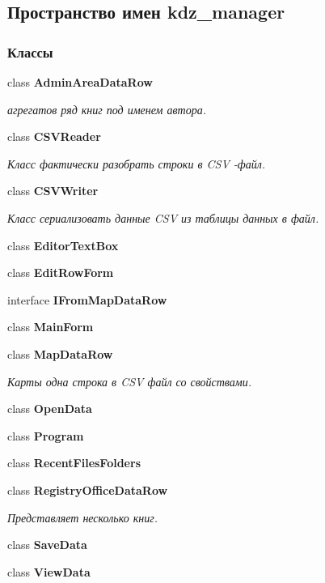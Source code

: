 \subsection{Пространство имен kdz\+\_\+manager}
\label{namespacekdz__manager}
\subsubsection*{Классы}
\begin{DoxyCompactItemize}
\item 
class {\bf Admin\+Area\+Data\+Row}
\begin{DoxyCompactList}\small\item\em агрегатов ряд книг под именем автора. \end{DoxyCompactList}\item 
class {\bf C\+S\+V\+Reader}
\begin{DoxyCompactList}\small\item\em Класс фактически разобрать строки в C\+S\+V -\/файл. \end{DoxyCompactList}\item 
class {\bf C\+S\+V\+Writer}
\begin{DoxyCompactList}\small\item\em Класс сериализовать данные C\+S\+V из таблицы данных в файл. \end{DoxyCompactList}\item 
class {\bf Editor\+Text\+Box}
\item 
class {\bf Edit\+Row\+Form}
\item 
interface {\bf I\+From\+Map\+Data\+Row}
\item 
class {\bf Main\+Form}
\item 
class {\bf Map\+Data\+Row}
\begin{DoxyCompactList}\small\item\em Карты одна строка в C\+S\+V файл со свойствами. \end{DoxyCompactList}\item 
class {\bf Open\+Data}
\item 
class {\bf Program}
\item 
class {\bf Recent\+Files\+Folders}
\item 
class {\bf Registry\+Office\+Data\+Row}
\begin{DoxyCompactList}\small\item\em Представляет несколько книг. \end{DoxyCompactList}\item 
class {\bf Save\+Data}
\item 
class {\bf View\+Data}
\end{DoxyCompactItemize}
